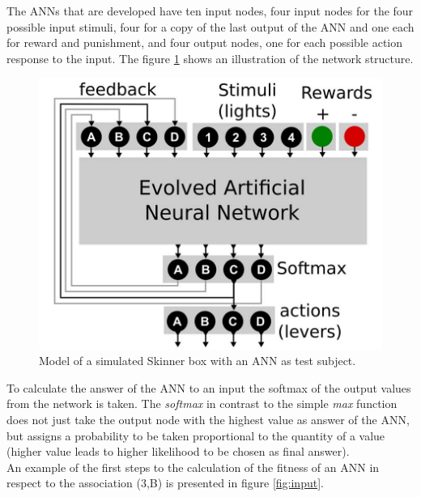 \documentclass[12pt,twoside]{article}
\theoremstyle{plain}
\theoremstyle{definition}
\theoremstyle{remark}
\begin{document}
The ANNs that are developed have ten input nodes, four input nodes for the four possible input stimuli, four for a copy of the last output of the ANN and one each for reward and punishment, and four output nodes, one for each possible action response to the input.
The figure \ref{fig:formalization} shows an illustration of the network structure.

\begin{figure}[h]
	\begin{center}
		\includegraphics[width=.4\textwidth]{network_structure.png}
	\end{center}
	\caption[Model of a simulated Skinner box with an ANN as test subject.]{Model of a simulated Skinner box with an ANN as test subject.\footnotemark}
	\label{fig:formalization}
\end{figure}

To calculate the answer of the ANN to an input the softmax of the output values from the network is taken. The \textit{softmax} in contrast to the simple \textit{max} function does not just take the output node with the highest value as answer of the ANN, but assigns a probability to be taken proportional to the quantity of a value (higher value leads to higher likelihood to be chosen as final answer).\\
An example of the first steps to the calculation of the fitness of an ANN in respect to the association (3,B) is presented in figure \ref{fig:input}.\medskip
\end{document}
